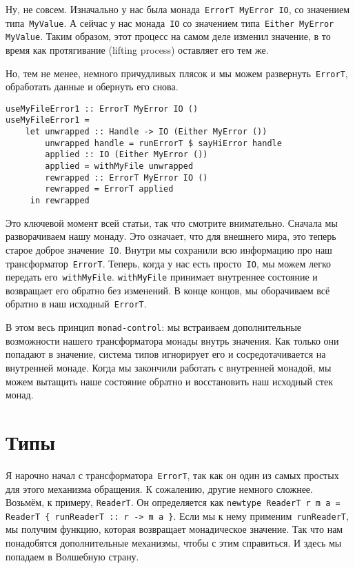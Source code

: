 Ну, не совсем. Изначально у нас была монада~\lstinline'ErrorT MyError IO', со
значением типа~\lstinline'MyValue'. А сейчас у нас монада~\lstinline'IO' со
значением типа~\lstinline'Either MyError MyValue'. Таким образом, этот процесс
на самом деле изменил значение, в то время как протягивание (lifting process)
оставляет его тем же.

Но, тем не менее, немного причудливых плясок и мы можем
развернуть~\lstinline'ErrorT', обработать данные и обернуть его снова.

\begin{lstlisting}
useMyFileError1 :: ErrorT MyError IO ()
useMyFileError1 =
    let unwrapped :: Handle -> IO (Either MyError ())
        unwrapped handle = runErrorT $ sayHiError handle
        applied :: IO (Either MyError ())
        applied = withMyFile unwrapped
        rewrapped :: ErrorT MyError IO ()
        rewrapped = ErrorT applied
     in rewrapped
\end{lstlisting}

Это ключевой момент всей статьи, так что смотрите внимательно. Сначала мы
разворачиваем нашу монаду. Это означает, что для внешнего мира, это теперь
старое доброе значение~\lstinline'IO'. Внутри мы сохранили всю информацию про
наш трансформатор~\lstinline'ErrorT'. Теперь, когда у нас есть
просто~\lstinline'IO', мы можем легко передать его~\lstinline'withMyFile'.
\lstinline'withMyFile' принимает внутреннее состояние и возвращает его обратно
без изменений. В конце концов, мы оборачиваем всё обратно в наш
исходный~\lstinline'ErrorT'.

В этом весь принцип \texttt{monad-control}: мы встраиваем дополнительные
возможности нашего трансформатора монады внутрь значения. Как только они
попадают в значение, система типов игнорирует его и сосредотачивается на
внутренней монаде. Когда мы закончили работать с внутренней монадой, мы можем
вытащить наше состояние обратно и восстановить наш исходный стек монад.

\section{Типы}
Я нарочно начал с трансформатора~\lstinline'ErrorT', так как он один из самых
простых для этого механизма обращения. К сожалению, другие немного сложнее.
Возьмём, к примеру, \lstinline'ReaderT'. Он определяется как
\lstinline'newtype ReaderT r m a = ReaderT { runReaderT :: r -> m a }'.
Если мы к нему применим~\lstinline'runReaderT', мы получим функцию, которая
возвращает монадическое значение. Так что нам понадобятся дополнительные
механизмы, чтобы с этим справиться. И здесь мы попадаем в Волшебную страну.


